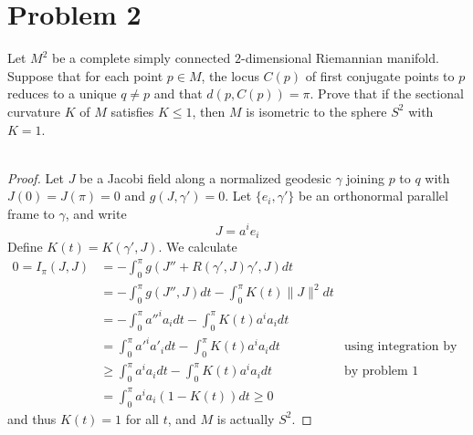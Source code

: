 \documentclass[fontsize=11pt]{scrartcl} %
\numberwithin{equation}{section} %
\numberwithin{figure}{section} %
\numberwithin{table}{section} %
\begin{document}
\section*{Problem 2}
Let $M^2$ be a complete simply connected $2$-dimensional Riemannian manifold.
Suppose that for each point $p\in M$, the locus $C(p)$ of first conjugate points
to $p$ reduces to a unique $q\neq p$ and that $d(p,C(p))=\pi$. Prove that if the
sectional curvature $K$ of $M$ satisfies $K\leq 1$, then $M$ is isometric to the
sphere $S^2$ with $K=1$.
\\
\\
\begin{proof}
    Let $J$ be a Jacobi field along a normalized geodesic $\gamma$ joining $p$
    to $q$ with $J(0)=J(\pi)=0$ and $g(J,\gamma')=0$. Let $\{e_i,\gamma'\}$ be
    an orthonormal parallel frame to $\gamma$, and write
    \[
        J = a^ie_i
    \]
    Define $K(t) = K(\gamma',J)$. We calculate
    \[
\begin{aligned}
    0 = I_{\pi}(J,J) &= -\int_0^{\pi}g(J'' + R(\gamma',J)\gamma',J)dt\\
    &= -\int_0^{\pi}g(J'',J)dt -\int_0^{\pi}K(t)\|J\|^2dt\\
    &= -\int_0^{\pi}a''^ia_idt - \int_0^{\pi}K(t)a^ia_idt\\
    &= \int_0^{\pi}a'^ia'_idt - \int_0^{\pi}K(t)a^ia_idt &\text{using
    integration by parts}\\
    &\geq \int_0^{\pi}a^ia_idt - \int_0^{\pi}K(t)a^ia_idt &\text{by problem 1}\\
    &=\int_0^{\pi}a^ia_i(1-K(t))dt\geq 0
\end{aligned}
    \]
    and thus $K(t)=1$ for all $t$, and $M$ is actually $S^2$.
\end{proof}

\newpage
\end{document}
